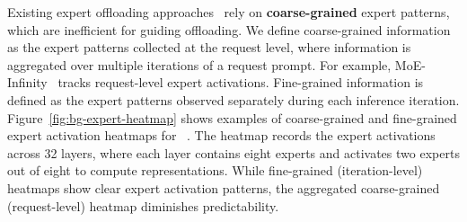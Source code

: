 Existing expert offloading approaches~\cite{eliseev2023fast,xue2024moe} rely on \textbf{coarse-grained} expert patterns, which are inefficient for guiding offloading. 
%
We define coarse-grained information as the expert patterns collected at the request level, where information is aggregated over multiple iterations of a request prompt.
For example, MoE-Infinity~\cite{xue2024moe} tracks request-level expert activations.
Fine-grained information is defined as the expert patterns observed separately during each inference iteration.
%
Figure~\ref{fig:bg-expert-heatmap} shows examples of coarse-grained and fine-grained expert activation heatmaps for \mixtral~\cite{jiang2024mixtral}.
The heatmap records the expert activations across 32 \MoE layers, where each layer contains eight experts and activates two experts out of eight to compute representations. 
%
While fine-grained (iteration-level) heatmaps show clear expert activation patterns, the aggregated coarse-grained (request-level) heatmap diminishes predictability. 

